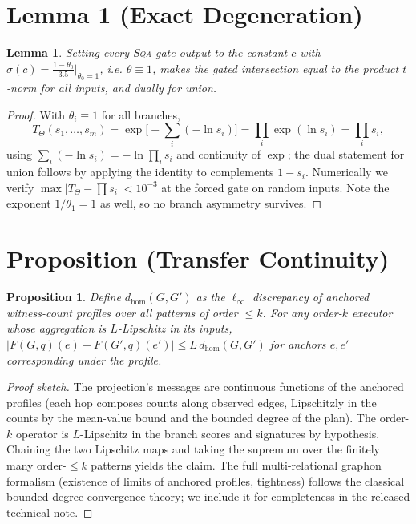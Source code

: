 \documentclass[journal]{IEEEtran}
\newtheorem{lemma*}{Lemma}
\newtheorem{proposition*}{Proposition}
\begin{document}
\section{Lemma 1 (Exact Degeneration)}

\begin{lemma*}
Setting every \textsc{Sqa}{} gate output to the constant $c$ with
$\sigma(c)=\tfrac{1-\theta_0}{3.5}\big|_{\theta_0=1}$, i.e.
$\theta\equiv1$, makes the gated intersection equal to the product
$t$-norm for all inputs, and dually for union.
\end{lemma*}
\begin{proof}
With $\theta_i\equiv 1$ for all branches,
\[
T_\Theta(s_1,\dots,s_m)=\exp\Big[-\sum_i(-\ln s_i)\Big]
=\prod_i \exp(\ln s_i)=\prod_i s_i,
\]
using $\sum_i(-\ln s_i)=-\ln\prod_i s_i$ and continuity of $\exp$; the
dual statement for union follows by applying the identity to complements
$1-s_i$. Numerically we verify $\max|T_\Theta-\prod s_i|<10^{-3}$ at the
forced gate on random inputs. Note the exponent $1/\theta_1=1$ as well,
so no branch asymmetry survives.
\end{proof}

\section{Proposition (Transfer Continuity)}

\begin{proposition*}
Define $d_{\mathrm{hom}}(G,G')$ as the $\ell_\infty$ discrepancy of
anchored witness-count profiles over all patterns of order $\le k$. For
any order-$k$ executor whose aggregation is $L$-Lipschitz in its inputs,
$|F(G,q)(e)-F(G',q)(e')|\le L\,d_{\mathrm{hom}}(G,G')$ for anchors $e,e'$
corresponding under the profile.
\end{proposition*}
\begin{proof}[Proof sketch]
The projection's messages are continuous functions of the anchored
profiles (each hop composes counts along observed edges, Lipschitzly in
the counts by the mean-value bound and the bounded degree of the plan).
The order-$k$ operator is $L$-Lipschitz in the branch scores and
signatures by hypothesis. Chaining the two Lipschitz maps and taking the
supremum over the finitely many order-$\le k$ patterns yields the claim.
The full multi-relational graphon formalism (existence of limits of
anchored profiles, tightness) follows the classical bounded-degree
convergence theory; we include it for completeness in the released
technical note.
\end{proof}
\end{document}
